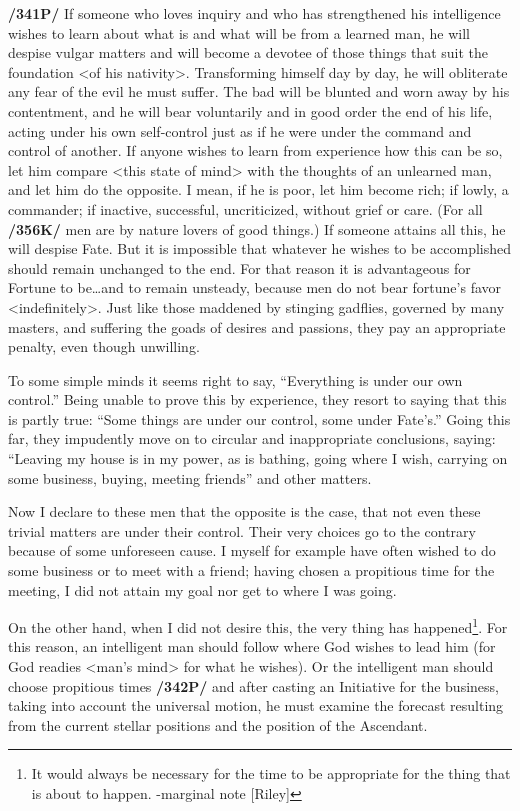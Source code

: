 \textbf{/341P/} If someone who loves inquiry and who has strengthened his intelligence wishes to learn about what is and what will be from a learned man, he will despise vulgar matters and will become a devotee of those things that suit the foundation <of his nativity>. Transforming himself day by day, he will obliterate any fear of the evil he must suffer. The bad will be blunted and worn away by his contentment, and he will bear voluntarily and in good order the end of his life, acting under his own self-control just as if he were under the command and control of another. If anyone wishes to learn from experience how this can be so, let him compare <this state of mind> with the thoughts of an unlearned man, and let him do the opposite.
I mean, if he is poor, let him become rich; if lowly, a commander; if inactive, successful, uncriticized, without grief or care. (For all \textbf{/356K/} men are by nature lovers of good things.) If someone attains all this, he will despise Fate. But it is impossible that whatever he wishes to be accomplished should remain unchanged to the end. For that reason it is advantageous for Fortune to be…and to remain unsteady,
because men do not bear fortune’s favor <indefinitely>. Just like those maddened by stinging gadflies, governed by many masters, and suffering the goads of desires and passions, they pay an appropriate penalty, even though unwilling.

To some simple minds it seems right to say, “Everything is under our own control.” Being unable to prove this by experience, they resort to saying that this is partly true: “Some things are under our control,
some under Fate’s.” Going this far, they impudently move on to circular and inappropriate conclusions, saying: “Leaving my house is in my power, as is bathing, going where I wish, carrying on some business,
buying, meeting friends” and other matters. 

Now I declare to these men that the opposite is the case, that not even these trivial matters are under their control. Their very choices go to the contrary because of some unforeseen cause. I myself for example have often wished to do some business or to meet with a friend; having chosen a propitious time for the meeting, I did not attain my goal nor get to where I was going.

On the other hand, when I did not desire this, the very thing has happened\footnote{It would always be necessary for the time to be appropriate for the thing that is about to happen. -marginal note [Riley]}. For this reason, an intelligent man should follow where God wishes to lead him (for God readies <man’s mind> for what he wishes). Or the intelligent man should choose propitious times \textbf{/342P/} and after casting an Initiative for the business, taking into account the universal motion, he must examine the forecast resulting from the current stellar positions and the position of the Ascendant.
 
\newpage